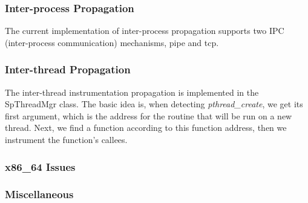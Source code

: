 \subsubsection{Inter-process Propagation}
The current implementation of inter-process propagation supports two IPC
(inter-process communication) mechanisms, pipe and tcp.



\subsubsection{Inter-thread Propagation}

The inter-thread instrumentation propagation is implemented in the SpThreadMgr
class. The basic idea is, when detecting {\em pthread\_create}, we get its first
argument, which is the address for the routine that will be run on a new thread.
Next, we find a function according to this function address, then we instrument
the function's callees.


\subsubsection{x86\_64 Issues}

\subsubsection{Miscellaneous}

